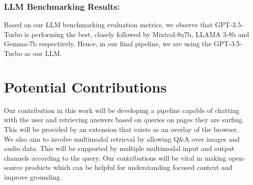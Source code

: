 \documentclass[sigconf,natbib=true,anonymous=false]{acmart}
\begin{document}
\subsubsection{\textbf{LLM Benchmarking Results: }}
Based on our LLM benchmarking evaluation metrics, we observe that GPT-3.5-Turbo is performing the best, closely followed by Mixtral-8x7b, LLAMA 3-8b and Gemma-7b respectively. Hence, in our final pipeline, we are using the GPT-3.5-Turbo as our LLM.

\section{Potential Contributions}
Our contribution in this work will be developing a pipeline capable of chatting with the user and retrieving answers based on queries on pages they are surfing. This will be provided by an extension that exists as an overlay of the browser. We also aim to involve multimodal retrieval by allowing Q\&A over images and audio data. This will be supported by multiple multimodal input and output channels according to the query. Our contributions will be vital in making open-source products which can be helpful for understanding focused context and improve grounding.


\appendix
\end{document}

